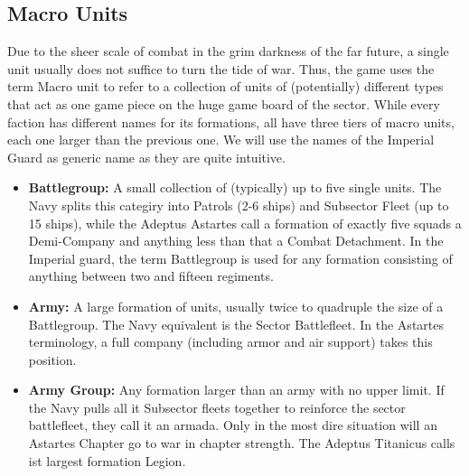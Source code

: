 \subsection{Macro Units}
Due to the sheer scale of combat in the grim darkness of the far future, a single unit usually does not suffice to turn the tide of war. Thus, the game uses the term Macro unit to refer to a collection of units of (potentially) different types that act as one game piece on the huge game board of the sector.  
While every faction has different names for its formations, all have three tiers of macro units, each one larger than the previous one. We will use the names of the Imperial Guard as generic name as they are quite intuitive. 
\begin{itemize} 
    \item \textbf{Battlegroup:} A small collection of (typically) up to five single units. The Navy splits this categiry into Patrols (2-6 ships) and Subsector Fleet (up to 15 ships), while the Adeptus Astartes call a formation of exactly five squads a Demi-Company and anything less than that a Combat Detachment. In the Imperial guard, the term Battlegroup is used for any formation consisting of anything between two and fifteen regiments. 
    \item \textbf{Army:} A large formation of units, usually twice to quadruple the size of a Battlegroup. The Navy equivalent is the Sector Battlefleet. In the Astartes terminology, a full company (including armor and air support) takes this position. 
    \item \textbf{Army Group:} Any formation larger than an army with no upper limit. If the Navy pulls all it Subsector fleets together to reinforce the sector battlefleet, they call it an armada. Only in the most dire situation will an Astartes Chapter go to war in chapter strength. The Adeptus Titanicus calls ist largest formation Legion. 
\end{itemize} 

